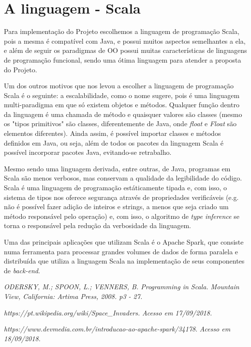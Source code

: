 \documentclass[rel_mlp]{iiufrgs}
\begin{document}
%
\chapter{A linguagem - Scala}

Para implementação do Projeto escolhemos a linguagem de programação Scala, pois a mesma é compatível com Java, e possui muitos aspectos semelhantes a ela, e além de seguir os paradigmas de OO possui muitas características de linguagens de programação funcional, sendo uma ótima linguagem para atender a proposta do Projeto.

Um dos outros motivos que nos levou a escolher a linguagem de programação Scala é o seguinte: a escalabilidade, como o nome sugere, pois é uma linguagem multi-paradigma em que só existem objetos e métodos. Qualquer função dentro da linguagem é uma chamada de método e quaisquer valores são classes (mesmo os "tipos primitivos" são classes, diferentemente de Java, onde \textit{float} e\textit{ Float} são elementos diferentes). Ainda assim, é possível importar classes e métodos definidos em Java, ou seja, além de todos os pacotes da linguagem Scala é possível incorporar pacotes Java, evitando-se retrabalho.

Mesmo sendo uma linguagem derivada, entre outras, de Java, programas em Scala são menos verbosos, mas conservam a qualidade da legibilidade do código. Scala é uma linguagem de programação estáticamente tipada e, com isso, o sistema de tipos nos oferece segurança através de propriedades verificáveis (e.g. não é possível fazer adição de inteiros e strings, a menos que seja criado um método responsável pelo operação) e, com isso, o algoritmo de \textit{type inference} se torna o responsável pela redução da verbosidade da linguagem.

Uma das principais aplicações que utilizam Scala é o Apache Spark, que consiste numa ferramenta para processar grandes volumes de dados de forma paralela e distribuída que utiliza a linguagem Scala na implementação de seus componentes de \textit{back-end}.
%

%






\noindent \textit{ODERSKY, M.; SPOON, L.; VENNERS, B. Programming in Scala. Mountain View, California: Artima Press, 2008. p3 - 27.}

\noindent\textit{ https://pt.wikipedia.org/wiki/Space_Invaders.}\textit{ Acesso em 17/09/2018.}

\noindent\textit{ https://www.devmedia.com.br/introducao-ao-apache-spark/34178}. \textit{Acesso em 18/09/2018.}
\end{document}
